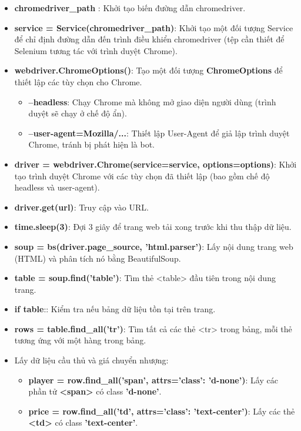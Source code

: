 \documentclass[12pt, letterpaper]{article}
\begin{document}
\begin{itemize}
    \item \textbf{chromedriver\_path }: Khởi tạo biến đường dẫn chromedriver.
    \item \textbf{service = Service(chromedriver\_path)}: Khởi tạo một đối tượng Service để chỉ định đường dẫn đến trình điều khiển chromedriver (tệp cần thiết để Selenium tương tác với trình duyệt Chrome).
    \item \textbf{webdriver.ChromeOptions()}: Tạo một đối tượng \textbf{ChromeOptions} để thiết lập các tùy chọn cho Chrome.
    \begin{itemize}[label=$\circ$]
        \item \textbf{--headless}: Chạy Chrome mà không mở giao diện người dùng (trình duyệt sẽ chạy ở chế độ ẩn).
        \item \textbf{ --user-agent=Mozilla/...}: Thiết lập User-Agent để giả lập trình duyệt Chrome, tránh bị phát hiện là bot.
    \end{itemize}
    \item \textbf{driver = webdriver.Chrome(service=service, options=options)}: Khởi tạo trình duyệt Chrome với các tùy chọn đã thiết lập (bao gồm chế độ headless và user-agent).
    \item \textbf{driver.get(url)}: Truy cập vào URL.
    \item \textbf{time.sleep(3)}: Đợi 3 giây để trang web tải xong trước khi thu thập dữ liệu.
    \item \textbf{soup = bs(driver.page\_source, 'html.parser')}: Lấy nội dung trang web (HTML) và phân tích nó bằng BeautifulSoup.
    \item \textbf{table = soup.find('table')}: Tìm thẻ <table> đầu tiên trong nội dung trang.
    \item \textbf{if table}:: Kiểm tra nếu bảng dữ liệu tồn tại trên trang.
    \item \textbf{rows = table.find\_all('tr')}: Tìm tất cả các thẻ <tr> trong bảng, mỗi thẻ tương ứng với một hàng trong bảng.
    \item Lấy dữ liệu cầu thủ và giá chuyển nhượng:
    \begin{itemize}[label=$\circ$]
        \item \textbf{player = row.find\_all('span', attrs={'class': 'd-none'})}: Lấy các phần tử \textbf{<span>} có class \textbf{'d-none'}.
        \item \textbf{price = row.find\_all('td', attrs={'class': 'text-center'})}: Lấy các thẻ \textbf{<td>} có class \textbf{'text-center'}.

\end{itemize}
\end{itemize}
\end{document}
